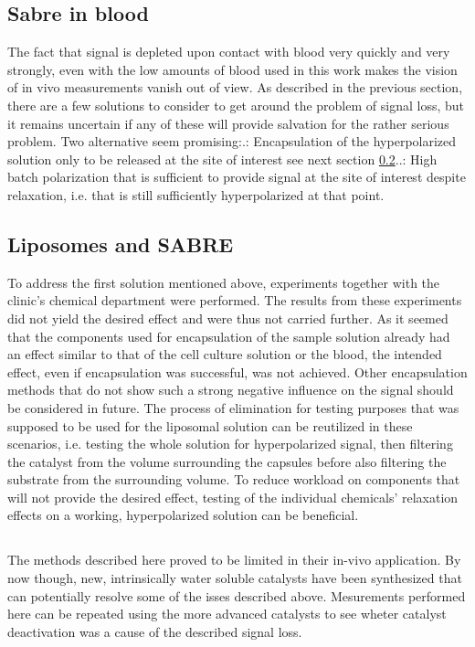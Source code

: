         \subsection{Sabre in blood}
        The fact that signal is depleted upon contact with blood very quickly and very strongly, even with the low amounts of blood used in this work makes the vision of in vivo measurements vanish out of view. As described in the previous section, there are a few solutions to consider to get around the problem of signal loss, but it remains uncertain if any of these will provide salvation for the rather serious problem. Two alternative seem promising:.: Encapsulation of the hyperpolarized solution only to be released at the site of interest see next section \ref{dc:subsec:liposomes}..: High batch polarization that is sufficient to provide signal at the site of interest despite relaxation, i.e. that is still sufficiently hyperpolarized at that point.
        \subsection{Liposomes and SABRE}
        \label{dc:subsec:liposomes}
        To address the first solution mentioned above, experiments together with the clinic's chemical department were performed. The results from these experiments did not yield the desired effect and were thus not carried further. As it seemed that the components used for encapsulation of the sample solution already had an effect similar to that of the cell culture solution or the blood, the intended effect, even if encapsulation was successful, was not achieved. Other encapsulation methods that do not show such a strong negative influence on the signal should be considered in future. The process of elimination for testing purposes that was supposed to be used for the liposomal solution can be reutilized in these scenarios, i.e. testing the whole solution for hyperpolarized signal, then filtering the catalyst from the volume surrounding the capsules before also filtering the substrate from the surrounding volume. To reduce workload on components that will not provide the desired effect, testing of the individual chemicals' relaxation effects on a working, hyperpolarized solution can be beneficial.
        \subsection*{}
        The methods described here proved to be limited in their in-vivo application. By now though, new, intrinsically water soluble catalysts have been synthesized \cite{spannring_new_2016} that can potentially resolve some of the isses described above. Mesurements performed here can be repeated using the more advanced catalysts to see wheter catalyst deactivation was a cause of the described signal loss.

